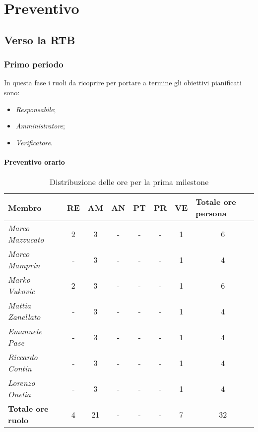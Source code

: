 \chapter{Preventivo}

\section{Verso la RTB}

\subsection{Primo periodo}

In questa fase i ruoli da ricoprire per portare a termine gli obiettivi
pianificati sono:
\begin{itemize}
    \item \textit{Responsabile};
    \item \textit{Amministratore};
    \item \textit{Verificatore}.
\end{itemize}

\subsubsection{Preventivo orario}

\begin{table}[H]
    \centering
    \begin{tabular}{|l|c|c|c|c|c|c|c|}
    \hline
    \textbf{Membro} & \multicolumn{1}{l|}{\textbf{RE}} & \multicolumn{1}{l|}{\textbf{AM}} & \multicolumn{1}{l|}{\textbf{AN}} & \multicolumn{1}{l|}{\textbf{PT}} & \multicolumn{1}{l|}{\textbf{PR}} & \multicolumn{1}{l|}{\textbf{VE}} & \multicolumn{1}{l|}{\textbf{Totale ore persona}} \\ \hline
    \textit{Marco Mazzucato}  & 2 & 3  & - & - & - & 1 & 6  \\ \hline
    \textit{Marco Mamprin}    & - & 3  & - & - & - & 1 & 4  \\ \hline
    \textit{Marko Vukovic}    & 2 & 3  & - & - & - & 1 & 6  \\ \hline
    \textit{Mattia Zanellato} & - & 3  & - & - & - & 1 & 4  \\ \hline
    \textit{Emanuele Pase}    & - & 3  & - & - & - & 1 & 4  \\ \hline
    \textit{Riccardo Contin}  & - & 3  & - & - & - & 1 & 4  \\ \hline
    \textit{Lorenzo Onelia}   & - & 3  & - & - & - & 1 & 4  \\ \hline
    \textbf{Totale ore ruolo} & 4 & 21 & - & - & - & 7 & 32 \\ \hline
    \end{tabular}
    \caption{Distribuzione delle ore per la prima milestone}
\end{table}

